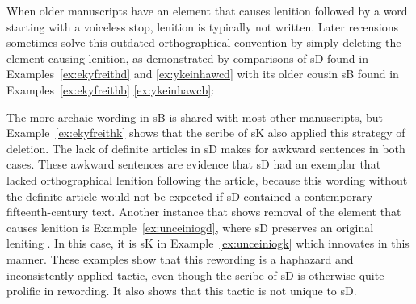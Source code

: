 When older manuscripts have an element that causes lenition followed by a word starting with a voiceless stop, lenition is typically not written. Later recensions sometimes solve this outdated orthographical convention by simply deleting the element causing lenition, as demonstrated by comparisons of \gls{sD} found in Examples~\ref{ex:ekyfreithd} and \ref{ex:ykeinhawcd} with its  older cousin \gls{sB} found in Examples~\ref{ex:ekyfreithb} \ref{ex:ykeinhawcb}:
\begin{mwl}
\end{mwl}
The more archaic wording in \gls{sB} is shared with most other manuscripts, but Example~\ref{ex:ekyfreithk} shows that the scribe of \gls{sK} also applied this strategy of deletion. The lack of definite articles in \gls{sD}  makes for awkward sentences in both cases. These awkward sentences are evidence that \gls{sD} had an exemplar that  lacked orthographical lenition following the article, because this wording without the definite article would not be expected if \gls{sD} contained a contemporary fifteenth-century text. Another instance that shows removal of the element that causes lenition is  Example~\ref{ex:unceiniogd}, where \gls{sD} preserves an original leniting . In this case, it is \gls{sK} in Example~\ref{ex:unceiniogk} which innovates in this manner. These examples show that this rewording is a haphazard and inconsistently applied tactic, even though the scribe of \gls{sD} is otherwise quite prolific in rewording. It also shows that this tactic is not unique to \gls{sD}.
\begin{mwl}
\end{mwl}
